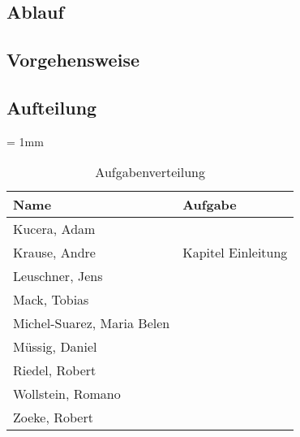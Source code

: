 \subsection{Ablauf}

\subsection{Vorgehensweise}

\subsection{Aufteilung}
\begin{table}[H]
	\sffamily
	\caption{Aufgabenverteilung}
	\tabulinesep = 1mm %
	\centering
		\begin{tabu} to 0.9\textwidth {| X[1.5] | X[3] |}
		\hline
		\textbf{Name} & \textbf{Aufgabe}\\
		\hline 
		Kucera, Adam & \\
		\hline
		Krause, Andre & Kapitel Einleitung\\
		\hline
		Leuschner, Jens & \\
		\hline
		Mack, Tobias & \\
		\hline
		Michel-Suarez, Maria Belen & \\
		\hline
		Müssig, Daniel & \\
		\hline
		Riedel, Robert & \\
		\hline
		Wollstein, Romano & \\
		\hline
		Zoeke, Robert & \\
		\hline
	\end{tabu}
\end{table}